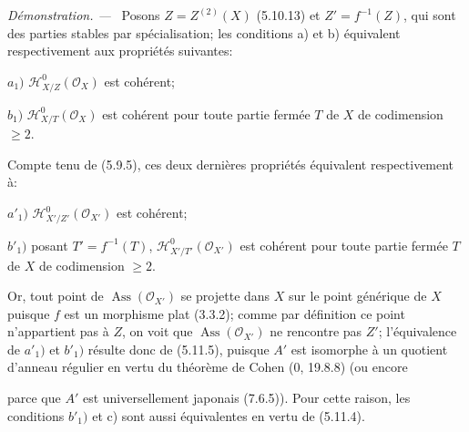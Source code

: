\documentclass[10pt,oneside]{book}
\newcommand{\oldpage}[2][]{%
  \setcounter{footnote}{0}%
  \marginpar{\scriptsize\textbf{#1}~|~#2}\ignorespaces}
\newenvironment{proof}{%
  \par\medskip\noindent\textit{Démonstration. ---\ }}{\par}
\begin{document}
\begin{proof}
Posons $Z=Z^{(2)}(X)$ (5.10.13) et $Z'=f^{-1}(Z)$, qui sont des parties
stables par spécialisation; les conditions a) et b) équivalent
respectivement aux propriétés suivantes:

$a_1)$ $\mathscr H^0_{X/Z}(\mathscr O_X)$ est cohérent;

$b_1)$ $\mathscr H^0_{X/T}(\mathscr O_X)$ est cohérent pour toute partie
fermée $T$ de $X$ de codimension $\geqslant2$.

Compte tenu de (5.9.5), ces deux dernières propriétés équivalent
respectivement à:

$a'_1)$ $\mathscr H^0_{X'/Z'}(\mathscr O_{X'})$ est cohérent;

$b'_1)$ posant $T'=f^{-1}(T)$,
$\mathscr H^0_{X'/T'}(\mathscr O_{X'})$ est cohérent pour toute partie
fermée $T$ de $X$ de codimension $\geqslant2$.

Or, tout point de $\operatorname{Ass}(\mathscr O_{X'})$ se projette dans
$X$ sur le point générique de $X$ puisque $f$ est un morphisme plat
(3.3.2); comme par définition ce point n'appartient pas à $Z$, on voit que
$\operatorname{Ass}(\mathscr O_{X'})$ ne rencontre pas $Z'$;
l'équivalence de $a'_1)$ et $b'_1)$ résulte donc de (5.11.5), puisque $A'$
est isomorphe à un quotient d'anneau régulier en vertu du théorème de Cohen
(0, 19.8.8) (ou encore

\oldpage[IV-2]{189}

parce que $A'$ est universellement japonais (7.6.5)). Pour cette raison,
les conditions $b'_1)$ et c) sont aussi équivalentes en vertu de (5.11.4).
\end{proof}
\end{document}
